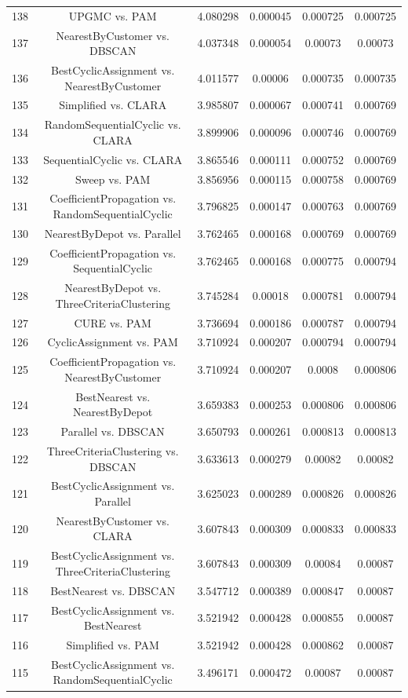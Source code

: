 \documentclass[a4paper,10pt]{article}
\begin{document}
\begin{landscape}
\begin{table}[!htp]
\begin{tabular}{cccccc}
138&UPGMC vs. PAM&4.080298&0.000045&0.000725&0.000725\\
137&NearestByCustomer vs. DBSCAN&4.037348&0.000054&0.00073&0.00073\\
136&BestCyclicAssignment vs. NearestByCustomer&4.011577&0.00006&0.000735&0.000735\\
135&Simplified vs. CLARA&3.985807&0.000067&0.000741&0.000769\\
134&RandomSequentialCyclic vs. CLARA&3.899906&0.000096&0.000746&0.000769\\
133&SequentialCyclic vs. CLARA&3.865546&0.000111&0.000752&0.000769\\
132&Sweep vs. PAM&3.856956&0.000115&0.000758&0.000769\\
131&CoefficientPropagation vs. RandomSequentialCyclic&3.796825&0.000147&0.000763&0.000769\\
130&NearestByDepot vs. Parallel&3.762465&0.000168&0.000769&0.000769\\
129&CoefficientPropagation vs. SequentialCyclic&3.762465&0.000168&0.000775&0.000794\\
128&NearestByDepot vs. ThreeCriteriaClustering&3.745284&0.00018&0.000781&0.000794\\
127&CURE vs. PAM&3.736694&0.000186&0.000787&0.000794\\
126&CyclicAssignment vs. PAM&3.710924&0.000207&0.000794&0.000794\\
125&CoefficientPropagation vs. NearestByCustomer&3.710924&0.000207&0.0008&0.000806\\
124&BestNearest vs. NearestByDepot&3.659383&0.000253&0.000806&0.000806\\
123&Parallel vs. DBSCAN&3.650793&0.000261&0.000813&0.000813\\
122&ThreeCriteriaClustering vs. DBSCAN&3.633613&0.000279&0.00082&0.00082\\
121&BestCyclicAssignment vs. Parallel&3.625023&0.000289&0.000826&0.000826\\
120&NearestByCustomer vs. CLARA&3.607843&0.000309&0.000833&0.000833\\
119&BestCyclicAssignment vs. ThreeCriteriaClustering&3.607843&0.000309&0.00084&0.00087\\
118&BestNearest vs. DBSCAN&3.547712&0.000389&0.000847&0.00087\\
117&BestCyclicAssignment vs. BestNearest&3.521942&0.000428&0.000855&0.00087\\
116&Simplified vs. PAM&3.521942&0.000428&0.000862&0.00087\\
115&BestCyclicAssignment vs. RandomSequentialCyclic&3.496171&0.000472&0.00087&0.00087\\

\end{tabular}
\end{table}
\end{landscape}
\end{document}
